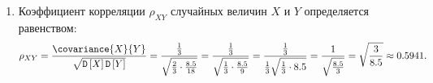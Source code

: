\documentclass[12pt,a4paper]{article}
\begin{document}
\begin{enumerate}
        \item Коэффициент корреляции $\rho_{XY}$ случайных величин $X$ и $Y$ определяется равенством:
        \begin{equation}
            \rho_{XY}
            = \frac{\covariance{X}{Y}}{\sqrt{\variance{X} \variance{Y}}}
            = \frac{\frac{1}{3}}{\sqrt{\frac{2}{3} \cdot \frac{8.5}{18}}}
            = \frac{\frac{1}{3}}{\sqrt{\frac{1}{3} \cdot \frac{8.5}{9}}}
            = \frac{\frac{1}{3}}{\frac{1}{3} \sqrt{\frac{1}{3} \cdot 8.5}}
            = \frac{1}{\sqrt{\frac{8.5}{3}}}
            = \sqrt{\frac{3}{8.5}}
            \approx 0.5941
            .
        \end{equation}

%
%

\end{enumerate}
\end{document}
